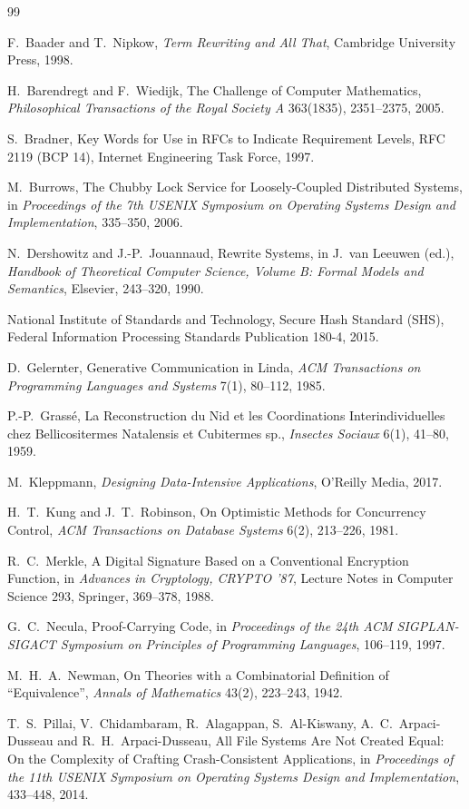 \documentclass[11pt,a4paper]{article}
\theoremstyle{plain}
\theoremstyle{definition}
\theoremstyle{remark}
\theoremstyle{definition}
\begin{document}
\begin{thebibliography}{99}

F.~Baader and T.~Nipkow, \emph{Term Rewriting and All That}, Cambridge University Press, 1998.

H.~Barendregt and F.~Wiedijk, The Challenge of Computer Mathematics, \emph{Philosophical Transactions of the Royal Society A} 363(1835), 2351--2375, 2005.

S.~Bradner, Key Words for Use in RFCs to Indicate Requirement Levels, RFC 2119 (BCP 14), Internet Engineering Task Force, 1997.

M.~Burrows, The Chubby Lock Service for Loosely-Coupled Distributed Systems, in \emph{Proceedings of the 7th USENIX Symposium on Operating Systems Design and Implementation}, 335--350, 2006.

N.~Dershowitz and J.-P.~Jouannaud, Rewrite Systems, in J.~van Leeuwen (ed.), \emph{Handbook of Theoretical Computer Science, Volume B: Formal Models and Semantics}, Elsevier, 243--320, 1990.

National Institute of Standards and Technology, Secure Hash Standard (SHS), Federal Information Processing Standards Publication 180-4, 2015.

D.~Gelernter, Generative Communication in Linda, \emph{ACM Transactions on Programming Languages and Systems} 7(1), 80--112, 1985.

P.-P.~Grass\'e, La Reconstruction du Nid et les Coordinations Interindividuelles chez Bellicositermes Natalensis et Cubitermes sp., \emph{Insectes Sociaux} 6(1), 41--80, 1959.

M.~Kleppmann, \emph{Designing Data-Intensive Applications}, O'Reilly Media, 2017.

H.~T.~Kung and J.~T.~Robinson, On Optimistic Methods for Concurrency Control, \emph{ACM Transactions on Database Systems} 6(2), 213--226, 1981.

R.~C.~Merkle, A Digital Signature Based on a Conventional Encryption Function, in \emph{Advances in Cryptology, CRYPTO '87}, Lecture Notes in Computer Science 293, Springer, 369--378, 1988.

G.~C.~Necula, Proof-Carrying Code, in \emph{Proceedings of the 24th ACM SIGPLAN-SIGACT Symposium on Principles of Programming Languages}, 106--119, 1997.

M.~H.~A.~Newman, On Theories with a Combinatorial Definition of ``Equivalence'', \emph{Annals of Mathematics} 43(2), 223--243, 1942.

T.~S.~Pillai, V.~Chidambaram, R.~Alagappan, S.~Al-Kiswany, A.~C.~Arpaci-Dusseau and R.~H.~Arpaci-Dusseau, All File Systems Are Not Created Equal: On the Complexity of Crafting Crash-Consistent Applications, in \emph{Proceedings of the 11th USENIX Symposium on Operating Systems Design and Implementation}, 433--448, 2014.

\end{thebibliography}
\end{document}
